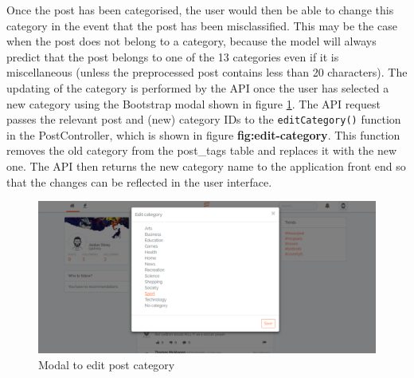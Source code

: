 Once the post has been categorised, the user would then be able to change this category in the event that the post has been misclassified. This may be the case when the post does not belong to a category, because the model will always predict that the post belongs to one of the 13 categories even if it is miscellaneous (unless the preprocessed post contains less than 20 characters). The updating of the category is performed by the API once the user has selected a new category using the Bootstrap modal shown in figure \ref{fig:category-modal}. The API request passes the relevant post and (new) category IDs to the \texttt{editCategory()} function in the PostController, which is shown in figure \textbf{fig:edit-category}. This function removes the old category from the post\_tags table and replaces it with the new one. The API then returns the new category name to the application front end so that the changes can be reflected in the user interface. 

\begin{figure}[H]
\centering
\includegraphics[width=\textwidth]{Images/Implementation/category-modal}
\caption{Modal to edit post category}
\label{fig:category-modal}
\end{figure}

